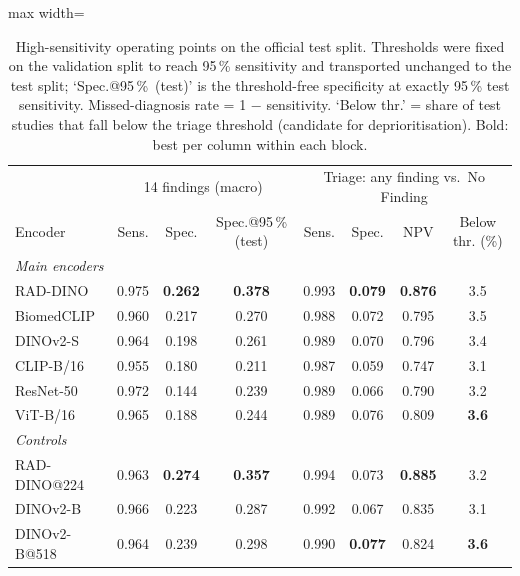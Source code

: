 \begin{table}[H]\centering
\scriptsize
\caption{High-sensitivity operating points on the official test split. Thresholds were fixed on the validation split to reach 95\,\% sensitivity and transported unchanged to the test split; `Spec.@95\,\%~(test)' is the threshold-free specificity at exactly 95\,\% test sensitivity. Missed-diagnosis rate = 1 $-$ sensitivity. `Below thr.' = share of test studies that fall below the triage threshold (candidate for deprioritisation). Bold: best per column within each block.}\label{tab:operating}
\begin{adjustbox}{max width=\linewidth}
\begin{tabular}{lccccccc}
\toprule
 & \multicolumn{3}{c}{14 findings (macro)} & \multicolumn{4}{c}{Triage: any finding vs.\ No Finding} \\ Encoder & Sens. & Spec. & Spec.@95\,\% (test) & Sens. & Spec. & NPV & Below thr. (\%) \\
\midrule

\multicolumn{8}{l}{\emph{Main encoders}} \\
RAD-DINO & 0.975 & \textbf{0.262} & \textbf{0.378} & 0.993 & \textbf{0.079} & \textbf{0.876} & 3.5 \\
BiomedCLIP & 0.960 & 0.217 & 0.270 & 0.988 & 0.072 & 0.795 & 3.5 \\
DINOv2-S & 0.964 & 0.198 & 0.261 & 0.989 & 0.070 & 0.796 & 3.4 \\
CLIP-B/16 & 0.955 & 0.180 & 0.211 & 0.987 & 0.059 & 0.747 & 3.1 \\
ResNet-50 & 0.972 & 0.144 & 0.239 & 0.989 & 0.066 & 0.790 & 3.2 \\
ViT-B/16 & 0.965 & 0.188 & 0.244 & 0.989 & 0.076 & 0.809 & \textbf{3.6} \\
\midrule
\multicolumn{8}{l}{\emph{Controls}} \\
RAD-DINO@224 & 0.963 & \textbf{0.274} & \textbf{0.357} & 0.994 & 0.073 & \textbf{0.885} & 3.2 \\
DINOv2-B & 0.966 & 0.223 & 0.287 & 0.992 & 0.067 & 0.835 & 3.1 \\
DINOv2-B@518 & 0.964 & 0.239 & 0.298 & 0.990 & \textbf{0.077} & 0.824 & \textbf{3.6} \\
\bottomrule
\end{tabular}
\end{adjustbox}
\end{table}
